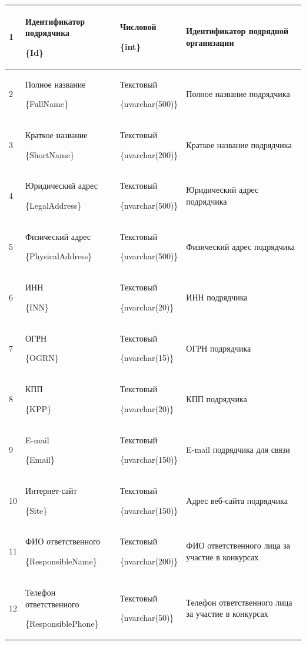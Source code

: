 \begin{footnotesize}
\begin{longtable}[h]{|p{}|p{}|p{}|p{}|}
	1 & Идентификатор подрядчика \par \{Id\} & Числовой \par \{int\} & Идентификатор подрядной организации \\ \hline
	2 & Полное название \par \{FullName\} & Текстовый \par \{nvarchar(500)\} & Полное название подрядчика \\ \hline
	3 & Краткое название \par \{ShortName\} & Текстовый \par \{nvarchar(200)\} & Краткое название подрядчика \\ \hline
	4 & Юридический адрес \par \{LegalAddress\} & Текстовый \par \{nvarchar(500)\} & Юридический адрес подрядчика \\ \hline
	5 & Физический адрес \par \{PhysicalAddress\} & Текстовый \par \{nvarchar(500)\} & Физический адрес подрядчика \\ \hline
	6 & ИНН \par \{INN\} & Текстовый \par \{nvarchar(20)\} & ИНН подрядчика \\ \hline
	7 & ОГРН \par \{OGRN\} & Текстовый \par \{nvarchar(15)\} & ОГРН подрядчика \\ \hline
	8 & КПП \par \{KPP\} & Текстовый \par \{nvarchar(20)\} & КПП подрядчика \\ \hline
	9 & E-mail \par \{Email\} & Текстовый \par \{nvarchar(150)\} & E-mail подрядчика для связи \\ \hline
	10 & Интернет-сайт \par \{Site\} & Текстовый \par \{nvarchar(150)\} & Адрес веб-сайта подрядчика \\ \hline
	11 & ФИО ответственного \par \{ResponsibleName\} & Текстовый \par \{nvarchar(200)\} & ФИО ответственного лица за участие в конкурсах \\ \hline
	12 & Телефон ответственного \par \{ResponsiblePhone\} & Текстовый \par \{nvarchar(50)\} & Телефон ответственного лица за участие в конкурсах \\ \hline
\end{longtable}
\end{footnotesize}

